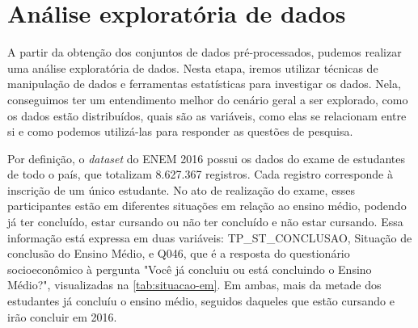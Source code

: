 \section{Análise exploratória de dados}
\label{sec:eda}
A partir da obtenção dos conjuntos de dados pré-processados, pudemos realizar uma análise exploratória de dados. Nesta etapa, iremos utilizar técnicas de manipulação de dados e ferramentas estatísticas para investigar os dados. Nela, conseguimos ter um entendimento melhor do cenário geral a ser explorado, como os dados estão distribuídos, quais são as variáveis, como elas se relacionam entre si e como podemos utilizá-las para responder as questões de pesquisa.

Por definição, o \textit{dataset} do ENEM 2016 possui os dados do exame de estudantes de todo o país, que totalizam 8.627.367 registros. Cada registro corresponde à inscrição de um único estudante. No ato de realização do exame, esses participantes estão em diferentes situações em relação ao ensino médio, podendo já ter concluído, estar cursando ou não ter concluído e não estar cursando. Essa informação está expressa em duas variáveis: TP\_ST\_CONCLUSAO, Situação de conclusão do Ensino Médio, e Q046, que é a resposta do questionário socioeconômico à pergunta "Você já concluiu ou está concluindo o Ensino Médio?", visualizadas na \autoref{tab:situacao-em}. Em ambas, mais da metade dos estudantes já concluíu o ensino médio, seguidos daqueles que estão cursando e irão concluir em 2016.

